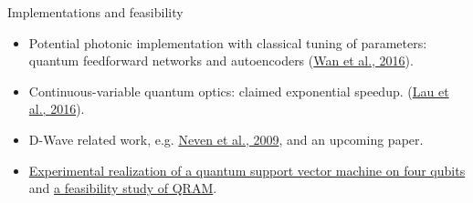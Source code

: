 \documentclass[compress]{beamer}\usetheme{Warsaw}\usecolortheme{crane}\useoutertheme[subsection=false]{smoothbars}
\begin{document}
\begin{frame}{Implementations and feasibility}
	\begin{itemize}
		\item Potential photonic implementation with classical tuning of parameters: quantum feedforward networks and autoencoders (\href{https://arxiv.org/abs/1612.01045}{Wan et al., 2016}).
		\item Continuous-variable quantum optics: claimed exponential speedup. (\href{http://arxiv.org/abs/1603.06222}{Lau et al., 2016}).
		\item D-Wave related work, e.g. \href{https://www.google.com/googleblogs/pdfs/nips_demoreport_120709_research.pdf}{Neven et al., 2009}, and an upcoming paper.
		\item \href{http://dx.doi.org/10.1103/physrevlett.114.140504}{Experimental realization of a quantum support vector machine on four qubits} and \href{http://dx.doi.org/10.1088/1367-2630/17/12/123010}{a feasibility study of QRAM}.
	\end{itemize}
\end{frame}
\end{document}
